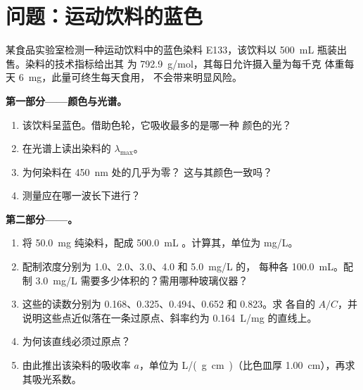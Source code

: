 \section{问题：运动饮料的蓝色}


\begin{problem}
\label{pb:g11:absorbance:1}
某食品实验室检测一种运动饮料中的蓝色染料 E133，该饮料以
\qty{500}{mL} 瓶装出售。染料的技术指标给出其
为 \qty{792.9}{g/mol}，其每日允许摄入量为每千克
体重每天 \qty{6}{mg}，此量可终生每天食用，
不会带来明显风险。

\medskip
\noindent\textbf{第一部分——颜色与光谱。}
\begin{enumerate}
  \item 该饮料呈蓝色。借助色轮，它吸收最多的是哪一种
        颜色的光？
  \item 在光谱上读出染料的 $\lambda_{\max}$。
  \item 为何染料在 \qty{450}{nm} 处的几乎为零？
        这与其颜色一致吗？
  \item 测量应在哪一波长下进行？
\end{enumerate}

\medskip
\noindent\textbf{第二部分——。}
\begin{enumerate}[resume]
  \item 将 \qty{50.0}{mg} 纯染料，配成 \qty{500.0}{mL}
        。计算其，单位为 \si{mg/L}。
  \item 配制浓度分别为 1.0、2.0、3.0、4.0 和 \qty{5.0}{mg/L} 的，
        每种各 \qty{100.0}{mL}。配制 \qty{3.0}{mg/L} 
        需要多少体积的？需用哪种玻璃仪器？
  \item 这些的读数分别为 0.168、0.325、0.494、0.652 和 0.823。求
        各自的 $A / C$，并说明这些点近似落在一条过原点、斜率约为
        \qty{0.164}{L/mg} 的直线上。
  \item 为何该直线必须过原点？
  \item 由此推出该染料的吸收率 $a$，单位为 \si{L/(g.cm)}（比色皿厚
        \qty{1.00}{cm}），再求其吸光系数。
\end{enumerate}


\end{problem}
